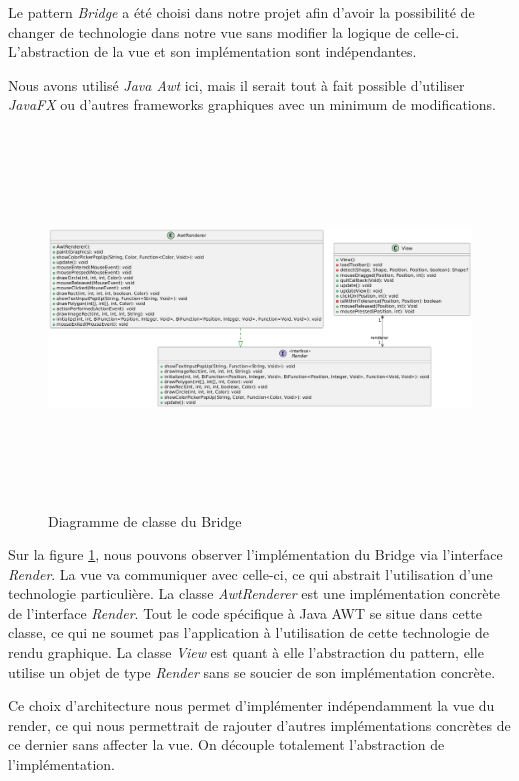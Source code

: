 \documentclass{article}
\begin{document}
Le pattern \textit{Bridge} a été choisi dans notre projet afin d'avoir la possibilité de changer de technologie dans notre vue
 sans modifier la logique de celle-ci. L'abstraction de la vue et son implémentation sont indépendantes.

Nous avons utilisé \textit{Java Awt} ici, mais il serait tout à fait possible d'utiliser \textit{JavaFX} ou d'autres frameworks graphiques
avec un minimum de modifications.

\begin{figure}[h]
    \centering
    \includegraphics[width=\textwidth,height=10.0cm,keepaspectratio]{bridge.png}
    \caption{Diagramme de classe du Bridge}
    \label{Bridge}
\end{figure}
\FloatBarrier

Sur la figure \ref{Bridge}, nous pouvons observer l'implémentation du Bridge via l'interface \textit{Render}.
La vue va communiquer avec celle-ci, ce qui abstrait l'utilisation d'une technologie particulière.
La classe \textit{AwtRenderer} est une implémentation concrète de l'interface \textit{Render}. 
Tout le code spécifique à Java AWT se situe dans cette classe, ce qui ne soumet pas l'application à
l'utilisation de cette technologie de rendu graphique.
La classe \textit{View} est quant à elle l'abstraction du pattern, elle utilise un objet de type \textit{Render} sans se soucier de son implémentation concrète.

Ce choix d'architecture nous permet d'implémenter indépendamment la vue du render, ce qui nous permettrait de rajouter d'autres
implémentations concrètes de ce dernier sans affecter la vue.
On découple totalement l'abstraction de l'implémentation.
\FloatBarrier
\end{document}
